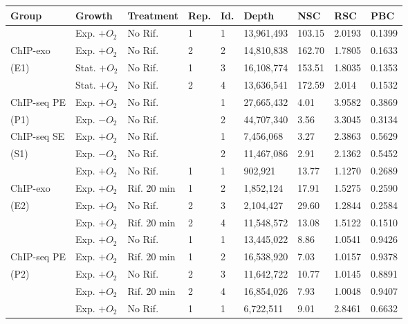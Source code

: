 \documentclass{bmcart}
\begin{document}
\begin{table}[h!]
  \centering
  \begin{tabu} to\linewidth{X[1.4,m,c]|X[1.2]|X[1.3,m,c]|X[.4,m,c]|X[.6,m,c]|X[1.2]|X[.6]|X[.6]|X[.5]}
    \firsthline
    \textbf{Group} & \textbf{Growth} & \textbf{Treatment} & \textbf{Rep.} & \textbf{Id.} &
    \textbf{Depth} & \textbf{NSC} & \textbf{RSC} & 
    \textbf{PBC}  \\
    \hline 
    &  Exp. $+O_2$ & No Rif. & 1 & 1 & 13,961,493 & 103.15 & 2.0193 & 0.1399 \\
    ChIP-exo  & Exp. $+O_2$ & No Rif. & 2 & 2 &14,810,838 & 162.70 &
    1.7805 & 0.1633 \\
    (E1)   & Stat. $+O_2$ & No Rif. & 1 & 3& 16,108,774 & 153.51 &
    1.8035 & 0.1353 \\
    & Stat. $+O_2$ & No Rif. & 2 & 4 & 13,636,541 & 172.59 & 2.014 & 0.1532 \\ 
    \hline
    ChIP-seq PE & Exp. $+O_2$ & No Rif. &  & 1 & 27,665,432 & 4.01 & 
    3.9582 & 0.3869 \\
    (P1) & Exp. $-O_2$ & No Rif. &  & 2 & 44,707,340 & 3.56 & 
    3.3045 & 0.3134 \\
    \hline
    ChIP-seq SE & Exp. $+O_2$ & No Rif. &  & 1 & 7,456,068 & 3.27 & 
    2.3863 & 0.5629 \\
    (S1) & Exp. $-O_2$ & No Rif. &  & 2 & 11,467,086 & 2.91 & 
    2.1362 & 0.5452 \\
    \hline\hline
    &  Exp. $+O_2$  & No Rif. & 1 & 1 &902,921 & 13.77 & 1.1270 & 0.2689\\
    ChIP-exo   & Exp. $+O_2$ & Rif. 20 min & 1 & 2 & 1,852,124 & 17.91 &
    1.5275 & 0.2590\\
    (E2)  & Exp. $+O_2$ & No Rif. &  2 & 3 & 2,104,427 & 29.60 & 1.2844 & 
    0.2584\\
    & Exp. $+O_2$ & Rif. 20 min & 2 & 4 & 11,548,572 & 13.08 & 1.5122 & 0.1510 \\
    \hline
    & Exp. $+O_2$ & No Rif. & 1 & 1 & 13,445,022 & 8.86 & 1.0541 & 0.9426 \\
    ChIP-seq PE & Exp. $+O_2$ & Rif. 20 min & 1 & 2 & 16,538,920 & 7.03 & 
    1.0157 & 0.9378 \\
    (P2) & Exp. $+O_2$ & No Rif. & 2  & 3 & 11,642,722 & 10.77 & 1.0145 &
    0.8891 \\
    & Exp. $+O_2$ & Rif. 20 min & 2 & 4 & 16,854,026 & 7.93 &1.0048& 0.9407 \\
    \hline
    & Exp. $+O_2$ & No Rif. & 1 & 1 & 6,722,511 & 9.01 & 2.8461 & 0.6632 \\

\end{tabu}
\end{table}
\end{document}
